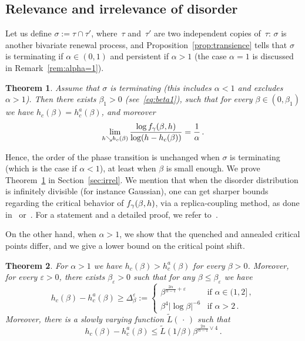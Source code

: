 \documentclass[11pt]{article}
\newtheorem{theo}{Theorem}[section]
\theoremstyle{definition}
\numberwithin{equation}{section}
\numberwithin{figure}{section}
\numberwithin{table}{section}
\newcommand{\ga}{\alpha}
\newcommand{\gb}{\beta}
\newcommand{\gep}{\varepsilon}
\newcommand{\gD}{\Delta}
\newcommand{\tf}{\textsc{f}} %
\renewcommand{\tilde}{\widetilde}
\begin{document}
\subsection{Relevance and irrelevance of disorder}

Let us define $\sigma :=\tau \cap \tau'$, where~$\tau$ and~$\tau'$ are two independent copies of~$\tau$: $\sigma$ is another bivariate renewal process, and Proposition~\ref{prop:transience} tells that $\sigma$ is terminating if $\ga\in(0,1)$ and persistent if $\ga>1$ (the case $\ga=1$ is discussed in Remark~\ref{rem:alpha=1}).


\begin{theo}\label{thm:irrel}
Assume that $\sigma$ is terminating (this includes $\ga<1$ and excludes $\ga >1$). Then there exists $\beta_1>0$ (see~\eqref{eq:beta1}), such that for every $\beta \in (0,\beta_1)$ we have $h_c(\beta) = h_c^a(\beta)$, and moreover
\begin{equation}\label{eq:s2}
\lim_{h \searrow h_c(\beta)} \frac{\log \tf_{\gamma}(\beta,h)}{\log (h-h_c(\beta))} = \frac{1}{\ga}\,.
\end{equation}
\end{theo}

Hence, the order of the phase transition is unchanged when $\sigma$ is terminating (which is the case if $\ga<1$), at least when $\gb$ is small enough. We prove Theorem~\ref{thm:irrel} in Section~\ref{sec:irrel}. We mention that when the disorder distribution is infinitely divisible (for instance Gaussian), one can get sharper bounds regarding the critical behavior of $\tf_{\gamma}(\beta,h)$, via a replica-coupling method, as done in~\cite{cf:Ton08} or~\cite{cf:Wa12}. For a statement and a detailed proof, we refer to~\cite{cf:Khatib}.

On the other hand, when $\ga>1$, we show that the quenched and annealed critical points differ, and we give a lower bound on the critical point shift.

\begin{theo}\label{thm:rel}
For $\ga>1$ we have $h_c(\gb) > h_c^{a}(\gb)$ for every $\beta>0$. Moreover, for every $\gep>0$, there exists $\gb_{\gep}>0$ such that for any $\gb\leq \gb_\gep$ we have
\begin{equation}\label{eq:rel}
h_c(\beta) - h_c^{a}(\beta)\ge \gD_{\gb}^{\gep}:=
\begin{cases}
\gb^{\frac{2\ga}{\ga-1} +\gep} & \text{if } \ga\in(1,2]\,, \\
\gb^4 \mathopen|\log \gb |^{-6} & \text{if } \ga >2\,.
\end{cases}
\end{equation}
Moreover, there is a slowly varying function $\tilde{L}({\,\cdot\,})$ such that
\begin{equation}\label{eq:upb}
h_c(\beta) - h_c^a (\beta) \le
\tilde{L}(1/\gb) \gb^{\frac{2\ga}{\ga-1} \vee 4}\,.
\end{equation}
\end{theo}
\end{document}
